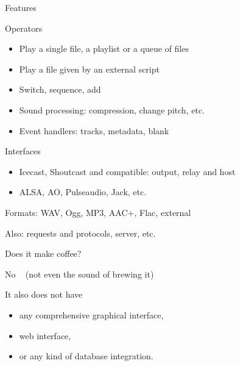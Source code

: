\documentclass{beamer}
\newcommand{\kw}[1]{{\color[rgb]{0,0.5,0.3} #1}}
\renewcommand{\textbf}[1]{{\color{blue} #1}}
\begin{document}

\begin{frame}{Features}

\begin{block}{Operators}
\begin{itemize}
\item Play a \kw{single} file, a \kw{playlist} or a queue of files
\item Play a file given by an external script
\item Switch, sequence, add
\item Sound processing: compression, change pitch, etc.
\item Event handlers: tracks, metadata, blank
\end{itemize}
\end{block}

\begin{block}{Interfaces}
\begin{itemize}
\item Icecast, Shoutcast and compatible: output, relay and host
\item ALSA, AO, Pulseaudio, Jack, etc.
\end{itemize}
\end{block}

\textbf{Formats:} WAV, Ogg, MP3, AAC+, Flac, external

\textbf{Also}: requests and protocols, server, etc.

\end{frame}


\begin{frame}{Does it make coffee?}
\vfill
\begin{center}
{\LARGE No} ~ (not even the sound of brewing it)
\end{center}
\vfill

It also does not have
\begin{itemize}
\item any comprehensive graphical interface,
\item web interface,
\item or any kind of database integration.
\end{itemize}
\end{frame}
\end{document}
